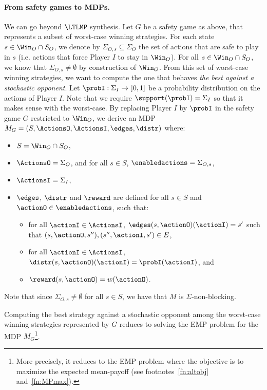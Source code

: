 \paragraph{From safety games to MDPs.} We can go beyond $\LTLMP$ synthesis. Let $G$ be a safety game as above, that represents a subset of worst-case winning strategies. 
For each state $s \in \Win_O\cap S_O$, we denote by $\Sigma_{O,s} \subseteq \Sigma_O$ the set of actions that are safe to play in $s$ (i.e. actions that force Player $I$ to stay in $\Win_O$). For all $s \in \Win_O\cap S_O$, we know that $\Sigma_{O,s} \neq \emptyset$ by construction of $\Win_O$.
From this set of worst-case winning strategies, we want to compute the one that behaves \textit{the best against a stochastic opponent}. Let $\probI : \Sigma_I \rightarrow\ ]0,1]$ be a probability distribution on the actions of Player $I$. Note that we require $\support(\probI) = \Sigma_I$ so that it makes sense with the worst-case. 
By replacing Player $I$ by $\probI$ in the safety game $G$ restricted to $\Win_O$, we derive an MDP $M_G = (S, \ActionsO, \ActionsI, \edges, \distr)$ where:
\begin{itemize}
\itemsep0.1em
\item $S = \Win_O\cap S_O$,
\item $\ActionsO = \Sigma_O$, and for all $s \in S$, $\enabledactions = \Sigma_{O,s}$,
\item $\ActionsI = \Sigma_I$,
\item $\edges$, $\distr$ and $\reward$ are defined for all $s \in S$ and $\actionO \in \enabledactions$, such that:
\begin{itemize}
\item for all $\actionI \in \ActionsI$, $\edges(s, \actionO)(\actionI) = s'$ such that $(s, \actionO, s''), (s'', \actionI, s') \in E$,
\item for all $\actionI \in \ActionsI$, $\distr(s, \actionO)(\actionI) = \probI(\actionI)$, and
\item $\reward(s, \actionO) = w(\actionO)$.
\end{itemize}
\end{itemize}
Note that since $\Sigma_{O,s} \neq \emptyset$ for all $s \in S$, we have that $M$ is $\Sigma$-non-blocking. 

Computing the best strategy against a stochastic opponent among the worst-case winning strategies represented by $G$ reduces to solving the EMP problem for the MDP $M_G$\footnote{More precisely, it reduces to the EMP problem where the objective is to maximize the expected mean-payoff (see footnotes~\ref{fn:altobj} and~\ref{fn:MPmax}).}.

